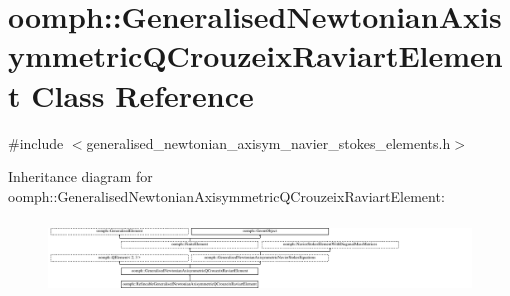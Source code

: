 \hypertarget{classoomph_1_1GeneralisedNewtonianAxisymmetricQCrouzeixRaviartElement}{}\section{oomph\+:\+:Generalised\+Newtonian\+Axisymmetric\+Q\+Crouzeix\+Raviart\+Element Class Reference}
\label{classoomph_1_1GeneralisedNewtonianAxisymmetricQCrouzeixRaviartElement}


{\ttfamily \#include $<$generalised\+\_\+newtonian\+\_\+axisym\+\_\+navier\+\_\+stokes\+\_\+elements.\+h$>$}

Inheritance diagram for oomph\+:\+:Generalised\+Newtonian\+Axisymmetric\+Q\+Crouzeix\+Raviart\+Element\+:\begin{figure}[H]
\begin{center}
\leavevmode
\includegraphics[height=1.994302cm]{classoomph_1_1GeneralisedNewtonianAxisymmetricQCrouzeixRaviartElement}
\end{center}
\end{figure}
